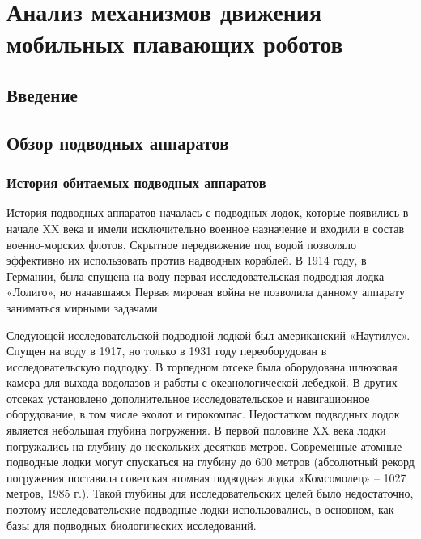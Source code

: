 \chapter{Анализ механизмов движения мобильных плавающих роботов}\label{ch:ch1}

\section{Введение}\label{sec:ch1/sec1}

\section{Обзор подводных аппаратов}\label{sec:ch1/sec21}


\subsection{История обитаемых подводных аппаратов}\label{subsec:ch1/sec21/sub1}

История подводных аппаратов началась с подводных лодок, которые появились в начале XX века и имели исключительно военное назначение и входили в состав военно-морских флотов. Скрытное передвижение под водой позволяло эффективно их использовать против надводных кораблей. В 1914 году, в Германии, была спущена на воду первая исследовательская подводная лодка «Лолиго», но начавшаяся Первая мировая война не позволила данному аппарату заниматься мирными задачами. 

Следующей исследовательской подводной лодкой был американский «Наутилус». Спущен на воду в 1917, но только в 1931 году переоборудован в исследовательскую подлодку. В торпедном отсеке была оборудована шлюзовая камера для выхода водолазов и работы с океанологической лебедкой. В других отсеках установлено дополнительное исследовательское и навигационное оборудование, в том числе эхолот и гирокомпас.
Недостатком подводных лодок является небольшая 	глубина погружения. В первой половине XX века лодки погружались на глубину до нескольких десятков метров. Современные атомные подводные лодки могут спускаться на глубину до 600 метров (абсолютный рекорд погружения поставила советская атомная подводная лодка «Комсомолец» – 1027 метров, 1985 г.). Такой глубины для исследовательских целей было недостаточно, поэтому исследовательские подводные лодки использовались, в основном, как базы для подводных биологических исследований.

